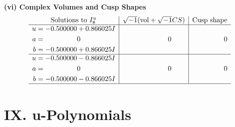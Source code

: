 \documentclass[1p]{elsarticle_modified}
\theoremstyle{definition}
\newcommand{\I}{\sqrt{-1}}
\begin{document}
\newpage\flushleft \textbf{(vi) Complex Volumes and Cusp Shapes}
$$\begin{array}{c|c|c}  
\text{Solutions to }I^u_{8}& \I (\text{vol} + \sqrt{-1}CS) & \text{Cusp shape}\\
 \hline 
\begin{aligned}
u &= -0.500000 + 0.866025 I \\
a &= \phantom{-0.000000 } 0 \\
b &= -0.500000 + 0.866025 I\end{aligned}
 & \phantom{-0.000000 } 0 & \phantom{-0.000000 } 0 \\ \hline\begin{aligned}
u &= -0.500000 - 0.866025 I \\
a &= \phantom{-0.000000 } 0 \\
b &= -0.500000 - 0.866025 I\end{aligned}
 & \phantom{-0.000000 } 0 & \phantom{-0.000000 } 0\\
 \hline 
 \end{array}$$\newpage
\newpage\renewcommand{\arraystretch}{1}
\centering \section*{ IX. u-Polynomials}
\end{document}
